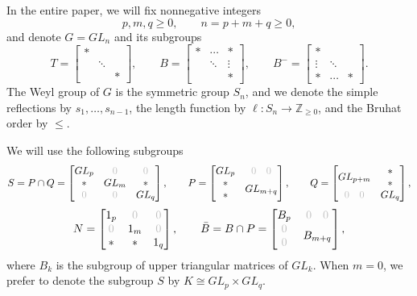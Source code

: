 \documentclass[12pt,reqno]{amsart}
\numberwithin{equation}{section}
\theoremstyle{definition}
\begin{document}
In the entire paper, we will fix nonnegative integers 
$$p,m,q\geq 0,\qquad n= p+m+q\geq 0,$$
and denote $G=GL_n$ and its subgroups 
$$
T = \left[\begin{matrix}
* \\ & \ddots \\ && *
\end{matrix}\right],\qquad 
B = \left[\begin{matrix}
*&\cdots&* \\ & \ddots&\vdots \\ && *
\end{matrix}\right],\qquad 
B^- = \left[\begin{matrix}
*& \\ \vdots& \ddots& \\ {}*&\cdots& *
\end{matrix}\right]
.$$
The Weyl group of $G$ is the symmetric group $S_n$, and we denote 
    the simple reflections by $s_1,\ldots,s_{n-1}$,
    the length function by $\ell:S_n\to \mathbb{Z}_{\geq 0}$, and 
    the Bruhat order by $\leq$. 

We will use the following subgroups
$$
\def\O{\color{lightgray}0}
S=P\cap Q=\left[\begin{matrix}
GL_p&\O&\O \\{}*&GL_m&*\\\O&\O&GL_q
\end{matrix}\right],\qquad 
P = 
\left[\begin{matrix}
GL_p&\,\,\O\quad\O\,\, \\
\begin{matrix}
*\\{}*
\end{matrix}&GL_{m+q}
\end{matrix}\right],\qquad 
Q = \left[\begin{matrix}
GL_{p+m}&\begin{matrix}
*\\{}*\end{matrix}
\\\,\,\O\quad \O\,\,&GL_q
\end{matrix}\right],
$$
$$\def\O{\color{lightgray}0}
N = 
\left[\begin{matrix}
1_p&\O&\O \\ \O& 1_m&\O\\ {}*&*& 1_q
\end{matrix}\right],\qquad 
\bar{B}=B\cap P=\left[\begin{matrix}
B_p &\,\,\O\quad\O\,\,\\
\begin{matrix}
\O\\{}\O
\end{matrix}& B_{m+q}
\end{matrix}\right],$$
where $B_k$ is the subgroup of upper triangular matrices of $GL_k$. 
When $m=0$, we prefer to denote the subgroup $S$ by $K\cong GL_p\times GL_q$. 
\end{document}
